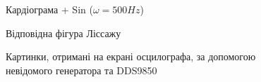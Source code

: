 \begin{figure}[h]
\begin{minipage}[h]{0.47\linewidth}
	\end{minipage}
	\vfill
	\begin{minipage}[h]{0.47\linewidth}
		 Кардіограма + Sin ($\omega = 500Hz$) \\
	\end{minipage}
	\hfill
	\begin{minipage}[h]{0.47\linewidth}
		 Відповідна фігура Ліссажу \\
	\end{minipage}
	\caption{Картинки, отримані на екрані осцилографа, за допомогою невідомого генератора та DDS9850}
	\label{fig:part2}
\end{figure}

